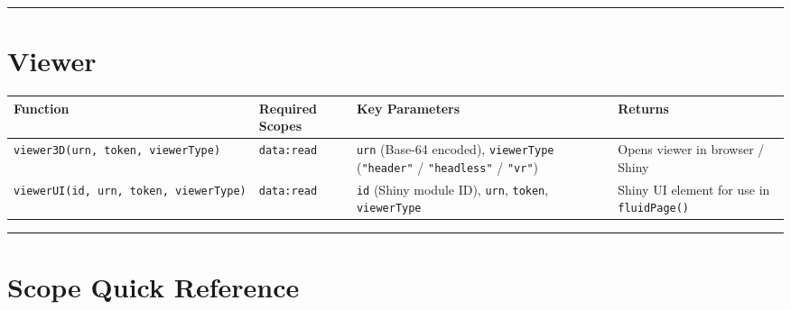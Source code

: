 \documentclass[
  11pt,
  letterpaper,
  DIV=11,
  numbers=noendperiod]{scrreprt}
\begin{document}
\begin{center}\rule{0.5\linewidth}{0.5pt}\end{center}

\section{Viewer}\label{viewer-1}

\begin{longtable}[]{@{}
  >{\raggedright\arraybackslash}p{}
  >{\raggedright\arraybackslash}p{}
  >{\raggedright\arraybackslash}p{}
  >{\raggedright\arraybackslash}p{}@{}}
\toprule\noalign{}
\begin{minipage}[b]{\linewidth}\raggedright
Function
\end{minipage} & \begin{minipage}[b]{\linewidth}\raggedright
Required Scopes
\end{minipage} & \begin{minipage}[b]{\linewidth}\raggedright
Key Parameters
\end{minipage} & \begin{minipage}[b]{\linewidth}\raggedright
Returns
\end{minipage} \\
\midrule\noalign{}
\endhead
\bottomrule\noalign{}
\endlastfoot
\texttt{viewer3D(urn,\ token,\ viewerType)} & \texttt{data:read} &
\texttt{urn} (Base-64 encoded), \texttt{viewerType} (\texttt{"header"} /
\texttt{"headless"} / \texttt{"vr"}) & Opens viewer in browser /
Shiny \\
\texttt{viewerUI(id,\ urn,\ token,\ viewerType)} & \texttt{data:read} &
\texttt{id} (Shiny module ID), \texttt{urn}, \texttt{token},
\texttt{viewerType} & Shiny UI element for use in
\texttt{fluidPage()} \\
\end{longtable}

\begin{center}\rule{0.5\linewidth}{0.5pt}\end{center}

\section{Scope Quick Reference}\label{scope-quick-reference}
\end{document}

